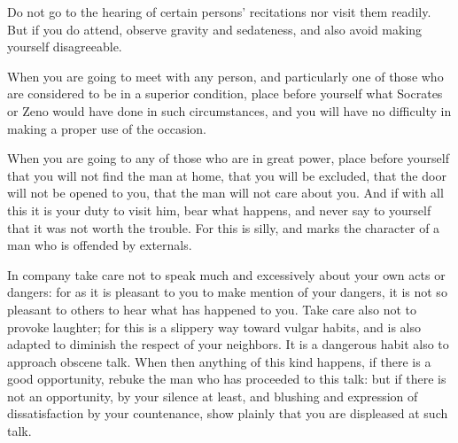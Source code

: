 Do  not go  to  the hearing  of  certain persons'  recitations  nor visit  them
readily. But if  you do attend, observe gravity and  sedateness, and also avoid
making yourself disagreeable.

When you are going  to meet with any person, and particularly  one of those who
are  considered to  be  in a  superior condition,  place  before yourself  what
Socrates or Zeno  would have done in  such circumstances, and you  will have no
difficulty in making a proper use of the occasion.

When  you are  going to  any of  those  who are  in great  power, place  before
yourself that  you will not find  the man at  home, that you will  be excluded,
that the door will not be opened to  you, that the man will not care about you.
And if with all this it is your duty to visit him, bear what happens, and never
say to yourself that it was not worth the trouble. For this is silly, and marks
the character of a man who is offended by externals.

In company take care  not to speak much and excessively about  your own acts or
dangers: for as  it is pleasant to you  to make mention of your  dangers, it is
not so pleasant to others to hear what  has happened to you. Take care also not
to provoke laughter;  for this is a  slippery way toward vulgar  habits, and is
also adapted to diminish the respect of your neighbors. It is a dangerous habit
also to  approach obscene  talk. When  then anything of  this kind  happens, if
there is a good opportunity, rebuke the man who has proceeded to this talk: but
if there  is not  an opportunity, by  your silence at  least, and  blushing and
expression of  dissatisfaction by your  countenance, show plainly that  you are
displeased at such talk.
